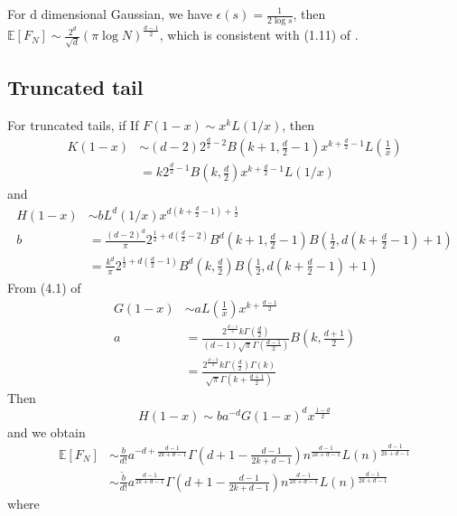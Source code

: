 \documentclass{article}
\def\E{\mathbb{E}}
\begin{document}
For d dimensional Gaussian, we have $\epsilon(s)=\frac{1}{2\log s}$,
then $\E[F_N]\sim \frac{2^d}{\sqrt{d}}(\pi \log N)^{\frac{d-1}{2}}$,
which is consistent with (1.11) of \cite{raynaud1970enveloppe}.

\subsection{Truncated tail}
For truncated tails, if If $F(1-x) \sim x^k L(1/x)$,
then
\begin{align}
    K(1-x) & \sim (d-2)2^{\frac{d}{2}-2} B(k+1,\frac{d}{2}-1)x^{k+\frac{d}{2}-1}L(\frac{1}{x})\\
    & = k 2^{\frac{d}{2}-1} B(k, \frac{d}{2}) x^{k+\frac{d}{2}-1} L(1/x) 
\end{align}
and
\begin{align}
    H(1-x)  & \sim b
    L^d(1/x) x^{d(k+\frac{d}{2}-1)+\frac{1}{2}} \\
    b & = \frac{(d-2)^d}{\pi}
    2^{\frac{1}{2} + d(\frac{d}{2}-2)} B^d(k+1, \frac{d}{2}-1)
    B\left( \frac{1}{2},
    d(k+\frac{d}{2} -1)+1 \right) \\
    &=  \frac{k^d}{\pi}
    2^{\frac{1}{2} + d(\frac{d}{2}-1)} B^d(k, \frac{d}{2})
    B\left( \frac{1}{2},
    d(k+\frac{d}{2} -1)+1 \right)
\end{align}
From (4.1) of \cite{dwyer1991convex}
\begin{align}
    G(1-x) &\sim a
    L\left(\frac{1}{x} \right)
    x^{k+\frac{d-1}{2}} \\
    a &=\frac{2^{\frac{d-1}{2}} k \Gamma(\frac{d}{2})}
    {(d-1) \sqrt{\pi} \Gamma(\frac{d-1}{2})}
    B\left(k, \frac{d+1}{2}\right) \\
    &= \frac{2^{\frac{d-3}{2}} k \Gamma(\frac{d}{2})\Gamma(k)}
    {\sqrt{\pi} \Gamma\left(k+\frac{d+1}{2}\right)}
\end{align}
Then
\begin{equation}
    H(1-x) \sim ba^{-d} G(1-x)^d x^{\frac{1-d}{2}}
\end{equation}
and we obtain
\begin{align}\label{eq:efn_truncated_formula}
    \E[F_N] &\sim \frac{b}{d!}a^{-d+\frac{d-1}{2k+d-1}}
    \Gamma\left(d+1-\frac{d-1}{2k+d-1}\right)n^{\frac{d-1}{2k+d-1}}
    L(n)
    ^{\frac{d-1}{2k+d-1}} \\
    &\sim \frac{\tilde{b} }{d!}
    a^{\frac{d-1}{2k+d-1}}\Gamma\left(d+1-\frac{d-1}{2k+d-1}\right)n^{\frac{d-1}{2k+d-1}}
    L(n)
    ^{\frac{d-1}{2k+d-1}}
\end{align}
where
\end{document}

